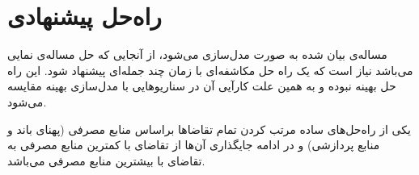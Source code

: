 \chapter{راه‌حل پیشنهادی}

مساله‌ی بیان شده به صورت 
مدل‌سازی می‌شود، از آنجایی که حل مساله‌ی 
نمایی می‌باشد نیاز است که یک راه حل مکاشفه‌ای با زمان چند جمله‌ای
پیشنهاد شود. این راه حل بهینه نبوده و به همین علت کارآیی آن
در سناریوهایی با مدل‌سازی بهینه مقایسه می‌شود.

یکی از راه‌حل‌های ساده مرتب کردن تمام تقاضاها براساس منابع مصرفی (پهنای باند و منابع پردازشی)
و در ادامه جایگذاری آن‌ها از تقاضای با کمترین منابع مصرفی به تقاضای با بیشترین منابع مصرفی می‌باشد.